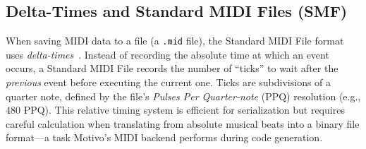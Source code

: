 \subsection{Delta-Times and Standard MIDI Files (SMF)}\label{detail-subsec:delta-times-and-standard-midi-files-(smf)}

When saving MIDI data to a file (a \texttt{.mid} file), the Standard MIDI File format uses
\textit{delta-times}~\cite{Moog_1986,Moore_1988}.
Instead of recording the absolute time at which an event occurs, a Standard MIDI File records the number of ``ticks'' to
wait after the \textit{previous} event before executing the current one.
Ticks are subdivisions of a quarter note, defined by the file's \textit{Pulses Per Quarter-note} (PPQ) resolution (e.g.,
480 PPQ).
This relative timing system is efficient for serialization but requires careful calculation when translating from
absolute musical beats into a binary file format---a task Motivo's MIDI backend performs during code generation.
